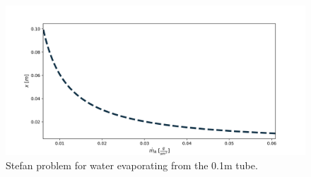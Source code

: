 \begin{figure}[H]
\centering\includegraphics[width=16cm]{Code/stefan-problem.png}
\caption{Stefan problem for water evaporating from the 0.1m tube.}
\label{fig:stefan-problem}
\end{figure}